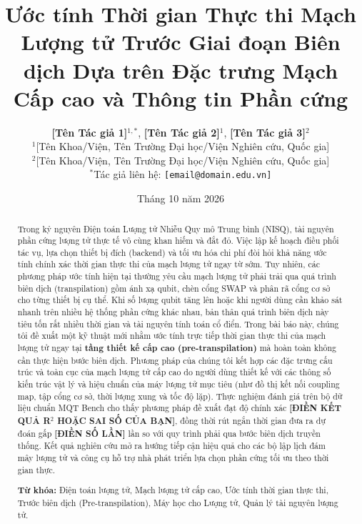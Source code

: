 \documentclass[11pt, a4paper]{article}
\title{\textbf{Ước tính Thời gian Thực thi Mạch Lượng tử Trước Giai đoạn Biên dịch Dựa trên Đặc trưng Mạch Cấp cao và Thông tin Phần cứng}}
\author{
    \textbf{[Tên Tác giả 1]}$^{1,*}$, \textbf{[Tên Tác giả 2]}$^{1}$, \textbf{[Tên Tác giả 3]}$^{2}$ \\
    \small $^{1}$[Tên Khoa/Viện, Tên Trường Đại học/Viện Nghiên cứu, Quốc gia] \\
    \small $^{2}$[Tên Khoa/Viện, Tên Trường Đại học/Viện Nghiên cứu, Quốc gia] \\
    \small $^{*}$Tác giả liên hệ: \texttt{[email@domain.edu.vn]}
}
\date{Tháng 10 năm 2026}
\begin{document}
\maketitle

\begin{abstract}
\noindent
Trong kỷ nguyên Điện toán Lượng tử Nhiễu Quy mô Trung bình (NISQ), tài nguyên phần cứng lượng tử thực tế vô cùng khan hiếm và đắt đỏ. Việc lập kế hoạch điều phối tác vụ, lựa chọn thiết bị đích (backend) và tối ưu hóa chi phí đòi hỏi khả năng ước tính chính xác thời gian thực thi của mạch lượng tử ngay từ sớm. Tuy nhiên, các phương pháp ước tính hiện tại thường yêu cầu mạch lượng tử phải trải qua quá trình biên dịch (transpilation) gồm ánh xạ qubit, chèn cổng SWAP và phân rã cổng cơ sở cho từng thiết bị cụ thể. Khi số lượng qubit tăng lên hoặc khi người dùng cần khảo sát nhanh trên nhiều hệ thống phần cứng khác nhau, bản thân quá trình biên dịch này tiêu tốn rất nhiều thời gian và tài nguyên tính toán cổ điển. Trong bài báo này, chúng tôi đề xuất một kỹ thuật mới nhằm ước tính trực tiếp thời gian thực thi của mạch lượng tử ngay tại \textbf{tầng thiết kế cấp cao (pre-transpilation)} mà hoàn toàn không cần thực hiện bước biên dịch. Phương pháp của chúng tôi kết hợp các đặc trưng cấu trúc và toàn cục của mạch lượng tử cấp cao do người dùng thiết kế với các thông số kiến trúc vật lý và hiệu chuẩn của máy lượng tử mục tiêu (như đồ thị kết nối coupling map, tập cổng cơ sở, thời lượng xung và tốc độ lặp). Thực nghiệm đánh giá trên bộ dữ liệu chuẩn MQT Bench cho thấy phương pháp đề xuất đạt độ chính xác \textbf{[ĐIỀN KẾT QUẢ R$^2$ HOẶC SAI SỐ CỦA BẠN]}, đồng thời rút ngắn thời gian đưa ra dự đoán gấp \textbf{[ĐIỀN SỐ LẦN]} lần so với quy trình phải qua bước biên dịch truyền thống. Kết quả nghiên cứu mở ra hướng tiếp cận hiệu quả cho các bộ lập lịch đám mây lượng tử và công cụ hỗ trợ nhà phát triển lựa chọn phần cứng tối ưu theo thời gian thực.

\vspace{0.3cm}
\noindent \textbf{Từ khóa:} Điện toán lượng tử, Mạch lượng tử cấp cao, Ước tính thời gian thực thi, Trước biên dịch (Pre-transpilation), Máy học cho Lượng tử, Quản lý tài nguyên lượng tử.
\end{abstract}
\end{document}
